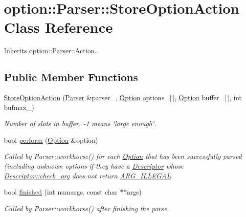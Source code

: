 \hypertarget{classoption_1_1_parser_1_1_store_option_action}{\section{option\-:\-:\-Parser\-:\-:\-Store\-Option\-Action \-Class \-Reference}
\label{classoption_1_1_parser_1_1_store_option_action}
}


\-Inherits \hyperlink{structoption_1_1_parser_1_1_action}{option\-::\-Parser\-::\-Action}.

\subsection*{\-Public \-Member \-Functions}
\begin{DoxyCompactItemize}
\item 
\hyperlink{classoption_1_1_parser_1_1_store_option_action_aaa638cdd712202e3e10471d4299f7f9d}{\-Store\-Option\-Action} (\hyperlink{classoption_1_1_parser}{\-Parser} \&parser\-\_\-, \hyperlink{classoption_1_1_option}{\-Option} options\-\_\-\mbox{[}$\,$\mbox{]}, \hyperlink{classoption_1_1_option}{\-Option} buffer\-\_\-\mbox{[}$\,$\mbox{]}, int bufmax\-\_\-)
\begin{DoxyCompactList}\small\item\em \-Number of slots in {\ttfamily buffer}. {\ttfamily -\/1} means \char`\"{}large enough\char`\"{}. \end{DoxyCompactList}\item 
bool \hyperlink{classoption_1_1_parser_1_1_store_option_action_a8931919fba5516377c202920db2b2f84}{perform} (\hyperlink{classoption_1_1_option}{\-Option} \&option)
\begin{DoxyCompactList}\small\item\em \-Called by \-Parser\-::workhorse() for each \hyperlink{classoption_1_1_option}{\-Option} that has been successfully parsed (including unknown options if they have a \hyperlink{structoption_1_1_descriptor}{\-Descriptor} whose \hyperlink{structoption_1_1_descriptor_aa5d675dba0214a4abd73007ff163cc67}{\-Descriptor\-::check\-\_\-arg} does not return \hyperlink{namespaceoption_aee8c76a07877335762631491e7a5a1a9a9528e32563b795bd2930b12d0a5e382d}{\-A\-R\-G\-\_\-\-I\-L\-L\-E\-G\-A\-L}. \end{DoxyCompactList}\item 
bool \hyperlink{classoption_1_1_parser_1_1_store_option_action_a617f675ef50a72ae36ce91f065bc8441}{finished} (int numargs, const char $\ast$$\ast$args)
\begin{DoxyCompactList}\small\item\em \-Called by \-Parser\-::workhorse() after finishing the parse. \end{DoxyCompactList}\end{DoxyCompactItemize}


